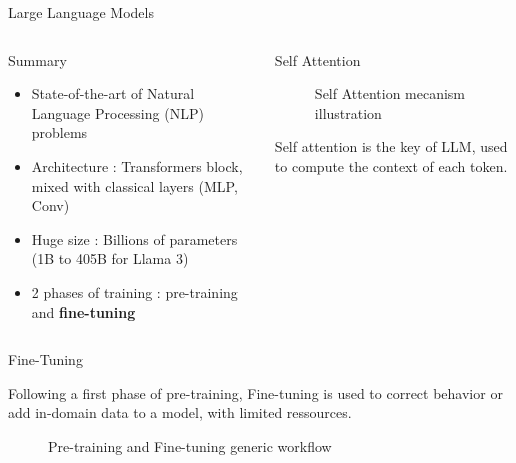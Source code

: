 \begin{frame}{Large Language Models}
\begin{columns}
      
    \begin{column}[t]{0.4\textwidth}
    \begin{block}{Summary}
    
        \begin{itemize}
            \item State-of-the-art of Natural Language Processing (NLP) problems
            \item Architecture : Transformers block, mixed with classical layers (MLP, Conv)
            \item Huge size : Billions of parameters (1B to 405B for Llama 3)
            \item 2 phases of training : pre-training and \textbf{fine-tuning}
        \end{itemize}
            

    \end{block}
    \end{column}
        
    \begin{column}[t]{0.55\textwidth}
    \begin{block}{Self Attention }

        \begin{figure}
            \centering
            
            \caption{Self Attention mecanism illustration}
        \end{figure}
    
        Self attention is the key of LLM, used to compute the context of each token.
    \end{block}  
    \end{column}
         
\end{columns}
\end{frame}


\begin{frame}{Fine-Tuning}

    Following a first phase of pre-training, Fine-tuning is used to correct behavior or add in-domain data to a model, with limited ressources. 


    \begin{figure}
        \centering
        \resizebox{\textwidth}{!}{
            
        }
        \caption{Pre-training and Fine-tuning generic workflow}
    \end{figure}  
        

    
\end{frame}

